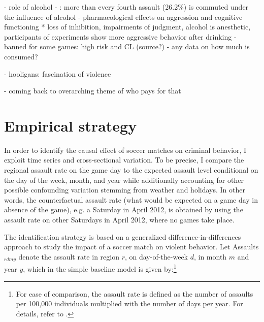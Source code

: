 \documentclass[11pt, a4paper]{article} %
\begin{document}
- role of alcohol
		- \cite{PCS2018}: more than every fourth assault (26.2\%) is commuted under the influence of alcohol
		- \cite{cook2013virtuous} pharmacological effects on aggression and cognitive functioning 
			* loss of inhibition, impairments of judgment, alcohol is anesthetic, participants of experiments show more aggressive behavior after drinking 
		- banned for some games: high risk and CL (source?)
		- any data on how much is consumed?
		
	
- hooligans: fascination of violence
	\cite{zis14_15} \cite{feltes2010fussballgewalt}

- coming back to overarching theme of who pays for that
	

\newpage
\section{Empirical strategy}\label{sec_soc_ext:empirical_strategy}

In order to identify the causal effect of soccer matches on criminal behavior, I exploit time series and cross-sectional variation. To be precise, I compare the regional assault rate on the game day to the expected assault level conditional on the day of the week, month, and year while additionally accounting for other possible confounding variation stemming from weather and holidays. In other words, the counterfactual assault rate (what would be expected on a game day in absence of the game), e.g. a Saturday in April 2012, is obtained by using the assault rate on other Saturdays in April 2012, where no games take place. %


The identification strategy is based on a generalized difference-in-differences approach to study the impact of a soccer match on violent behavior. Let Assaults$_{rdmy}$ denote the assault rate in region $r$, on day-of-the-week $d$, in month $m$ and year $y$, which in the simple baseline model is given by:\footnote{For ease of comparison, the assault rate is defined as the number of assaults per 100,000 individuals multiplied with the number of days per year. For details, refer to \cite{hener2019noise}.}
\end{document}
